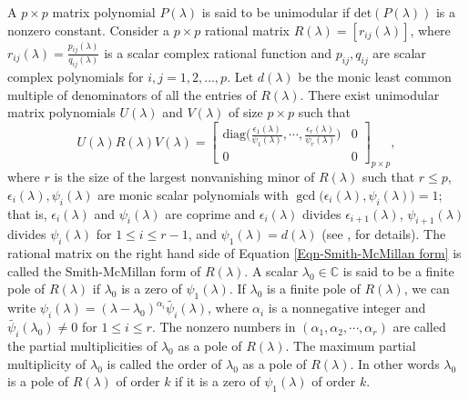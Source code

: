 \documentclass[12pt, reqno]{amsart}
\theoremstyle{definition}
\theoremstyle{remark}
\numberwithin{equation}{section}
\begin{document}
\medskip
A $p \times p$ matrix polynomial $P(\lambda)$ is said to be unimodular 
if $\text{det}(P(\lambda))$ is a nonzero constant. Consider a $p\times p$ rational 
matrix $R(\lambda)=[r_{ij}(\lambda)]$,  where $\displaystyle r_{ij}(\lambda) = 
\frac{p_{ij}(\lambda)}{q_{ij}(\lambda)}$ is a scalar complex rational function and 
$p_{ij}, q_{ij}$ are scalar complex polynomials for $i,j=1,2,\ldots,p$. Let 
$d(\lambda)$ be the monic least common multiple of denominators of all the entries 
of $R(\lambda)$. There exist unimodular matrix polynomials $U(\lambda)$ and 
$V(\lambda)$ of size $p\times p$ such that 
\begin{equation} \label{Eqn-Smith-McMillan form}
U(\lambda) R(\lambda) V(\lambda) = \begin{bmatrix}
\displaystyle \text{diag}\bigg(\frac{\epsilon_1(\lambda)}{\psi_1(\lambda)},\cdots,
\frac{\epsilon_r(\lambda)}{\psi_r(\lambda)}\bigg) & 0 \\
0 & 0
\end{bmatrix}_{p\times p},
\end{equation}
where $r$ is the size of the largest nonvanishing minor of $R(\lambda)$ such that 
$r \leq p$, $\epsilon_i(\lambda), \psi_i(\lambda)$ are monic scalar polynomials 
with $\gcd\textbf{(}\epsilon_i(\lambda), \psi_i(\lambda)\textbf{)} =1$; that is, 
$ \epsilon_i(\lambda)$ and $\psi_i(\lambda)$ are coprime and $\epsilon_i(\lambda)$ 
divides $\epsilon_{i+1}(\lambda)$, $\psi_{i+1}(\lambda)$ divides $ \psi_i(\lambda)$ 
for $1 \leq i \leq r-1$, and $\psi_1(\lambda) = d(\lambda)$ (see \cite{Rosenbrock}, 
\cite{Amparan-Dopico} for details). The rational matrix on the right hand side of 
Equation \eqref{Eqn-Smith-McMillan form} is called the Smith-McMillan form of 
$R(\lambda)$. A scalar $\lambda_0 \in \mathbb{C}$ is said to be a finite pole of 
$R(\lambda)$ if $\lambda_0$ is a zero of $\psi_1(\lambda)$. If $\lambda_0$ is a 
finite pole of $R(\lambda)$, we can write 
$\psi_i(\lambda) = (\lambda - \lambda_0)^{\alpha_i} \widetilde{\psi_i}(\lambda)$, 
where $\alpha_i$ is a nonnegative integer and $\widetilde{\psi_i}(\lambda_0) \neq 0$ 
for $1\leq i \leq r$. The nonzero numbers in $(\alpha_1,\alpha_2,\cdots,\alpha_r)$ 
are called the partial multiplicities of $\lambda_0$ as a pole of $R(\lambda)$.  
The maximum partial multiplicity of $\lambda_0$ is called the order 
of $\lambda_0$ as a pole of $R(\lambda)$. In other words $\lambda_0$ is a pole of 
$R(\lambda)$ of order $k$ if it is a zero of $\psi_1(\lambda)$ of order $k$.
\end{document}
